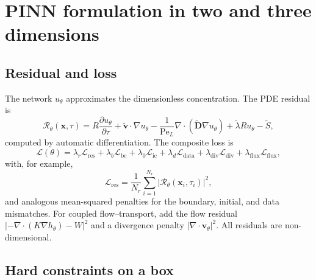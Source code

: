 \documentclass[11pt]{article}
\newcommand{\pdd}[2]{\frac{\partial #1}{\partial #2}}
\newcommand{\Pe}{\mathrm{Pe}}
\newcommand{\LL}{\mathcal{L}}
\newcommand{\RR}{\mathcal{R}}
\newcommand{\DD}{\mathbf{D}}
\newcommand{\vv}{\mathbf{v}}
\newcommand{\xx}{\mathbf{x}}
\newcommand{\abs}[1]{\left\lvert #1 \right\rvert}
\begin{document}
\section{PINN formulation in two and three dimensions}
\label{sec:pinn}

\subsection{Residual and loss}

The network $u_\theta$ approximates the dimensionless concentration.  The PDE
residual is
\begin{equation}
\label{eq:res}
\RR_\theta(\xx,\tau)=
R\pdd{u_\theta}{\tau}+\tilde{\vv}\cdot\nabla u_\theta
-\frac{1}{\Pe_L}\nabla\cdot(\tilde{\DD}\nabla u_\theta)
+\tilde\lambda R u_\theta-\tilde S,
\end{equation}
computed by automatic differentiation.  The composite loss is
\begin{equation}
\label{eq:loss}
\LL(\theta)=\lambda_r\LL_{\mathrm{res}}
+\lambda_b\LL_{\mathrm{bc}}
+\lambda_0\LL_{\mathrm{ic}}
+\lambda_d\LL_{\mathrm{data}}
+\lambda_{\mathrm{div}}\LL_{\mathrm{div}}
+\lambda_{\mathrm{flux}}\LL_{\mathrm{flux}},
\end{equation}
with, for example,
\begin{equation}
\label{eq:lossres}
\LL_{\mathrm{res}}=\frac1{N_r}\sum_{i=1}^{N_r}
\abs{\RR_\theta(\xx_i,\tau_i)}^2,
\end{equation}
and analogous mean-squared penalties for the boundary, initial, and data
mismatches.  For coupled flow--transport, add the flow residual
$\abs{-\nabla\cdot(K\nabla h_\theta)-W}^2$ and a divergence penalty
$\abs{\nabla\cdot\vv_\theta}^2$.  All residuals are non-dimensional.

\subsection{Hard constraints on a box}
\end{document}
